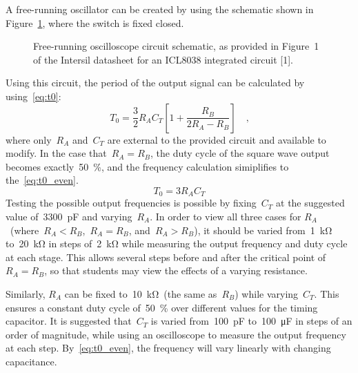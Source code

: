 A free-running oscillator can be created by using the schematic shown in
Figure~\ref{fig:free_run}, where the switch is fixed closed.
%
\begin{figure}[H]
	\centering
	
	\parbox{.6\textwidth}{
	\caption{Free-running oscilloscope circuit schematic, as provided in Figure~1 of the
	Intersil datasheet for an ICL8038 integrated circuit [1].}
	\label{fig:free_run}}
\end{figure}
%
Using this circuit, the period of the output signal can be calculated by using~\eqref{eq:t0}:
%
\begin{equation}
	T_0 = \frac{3}{2} R_A C_T \left[ 1 + \frac{R_B}{2R_A - R_B} \right] \quad \text{,}
	\label{eq:t0}
\end{equation}
%
where only~$R_A$ and~$C_T$ are external to the provided circuit and available
to modify.  In the case that~$R_A = R_B$, the duty cycle of the square wave
output becomes exactly~\SI{50}{\percent}, and the frequency calculation
simiplifies to the~\eqref{eq:t0_even}.
%
\begin{equation}
	T_0 = 3 R_A C_T
	\label{eq:t0_even}
\end{equation}
%
Testing the possible output frequencies is possible by fixing~$C_T$ at the
suggested value of~\SI{3300}{\pico\farad} and varying~$R_A$.  In order to view
all three cases for $R_A$~(where~$R_A < R_B$,~$R_A = R_B$, and~$R_A > R_B$), it
should be varied from~\SI{1}{\kilo\ohm} to~\SI{20}{\kilo\ohm} in steps
of~\SI{2}{\kilo\ohm} while measuring the output frequency and duty cycle at
each stage.  This allows several steps before and after the critical point
of~$R_A = R_B$, so that students may view the effects of a varying resistance.

Similarly, $R_A$ can be fixed to~\SI{10}{\kilo\ohm}~(the same as~$R_B$) while
varying~$C_T$.  This ensures a constant duty cycle of~\SI{50}{\percent} over
different values for the timing capacitor.  It is suggested that~$C_T$ is
varied from~\SI{100}{\pico\farad} to~\SI{100}{\micro\farad} in steps of an
order of magnitude, while using an oscilloscope to measure the output frequency
at each step.  By~\eqref{eq:t0_even}, the frequency will vary linearly with
changing capacitance.

\begin{figure}[H]
	\centering
	
\end{figure}

\begin{figure}[H]
	\centering
	
\end{figure}


